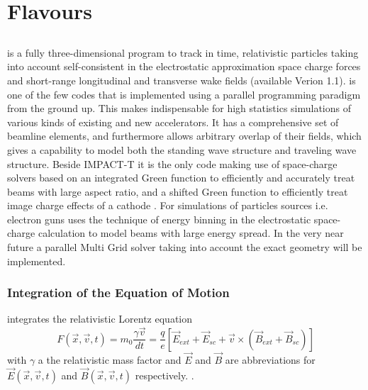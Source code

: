 \chapter{\opal Flavours}
\label{sec:opalFlavours}

\section{\opalt}
\opalt is a fully three-dimensional program to track in time, relativistic particles taking into account self-consistent in the electrostatic approximation space
charge forces and short-range longitudinal and transverse wake fields (available Verion 1.1). \opalt  is one of the few
codes  that is implemented using a parallel programming paradigm from the ground up. This makes \opalt indispensable for
high statistics simulations of various kinds of existing and new accelerators. It has a comprehensive set of beamline
elements, and furthermore allows arbitrary overlap of their fields, which gives \opalt a capability
to model both the standing wave structure and traveling wave structure. Beside IMPACT-T it is the only code making use of
space-charge solvers based on an integrated Green \cite{qiang2005} function to efficiently and accurately treat beams with
large aspect ratio, and a shifted Green function to efficiently treat image charge effects of a cathode \cite{fubiani2006,qiang2006-2}. 
For simulations of particles sources i.e. electron guns \opalt uses the technique of  energy binning in the electrostatic space-charge calculation to model beams with large
energy spread. In the very near future a parallel Multi Grid solver taking into account the exact geometry will be implemented.  

\subsection{Integration of the Equation of Motion}
\opalt integrates the relativistic Lorentz equation
\begin{equation}
F(\vec{x},\vec{v},t) = m_0 \frac{\gamma \vec{v}}{dt} =   \frac{q}{e}[\vec{E}_{ext} + \vec{E}_{sc} + \vec{v} \times (\vec{B}_{ext} + \vec{B}_{sc})]
\end{equation}
with $\gamma$ a the relativistic mass factor and $\vec{E}$  and $\vec{B}$ are abbreviations for $\vec{E}(\vec{x},\vec{v},t)$ and $\vec{B}(\vec{x},\vec{v},t)$
respectively. \latermore .


